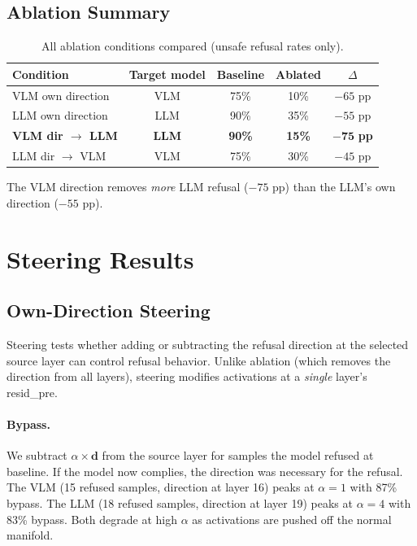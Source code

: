 \documentclass[11pt,a4paper]{article}
\begin{document}
\subsection{Ablation Summary}

\begin{table}[H]\centering
\caption{All ablation conditions compared (unsafe refusal rates only).}
\begin{tabular}{lcccc}
\toprule
\textbf{Condition} & \textbf{Target model} & \textbf{Baseline} & \textbf{Ablated} & \textbf{$\Delta$} \\
\midrule
VLM own direction & VLM & 75\% & 10\% & $-65$ pp \\
LLM own direction & LLM & 90\% & 35\% & $-55$ pp \\
\textbf{VLM dir $\to$ LLM} & \textbf{LLM} & \textbf{90\%} & \textbf{15\%} & $\mathbf{-75}$ \textbf{pp} \\
LLM dir $\to$ VLM & VLM & 75\% & 30\% & $-45$ pp \\
\bottomrule
\end{tabular}
\end{table}

The VLM direction removes \emph{more} LLM refusal ($-75$ pp) than the LLM's own direction ($-55$ pp).

\section{Steering Results}

\subsection{Own-Direction Steering}

Steering tests whether adding or subtracting the refusal direction at the selected source layer can control refusal behavior. Unlike ablation (which removes the direction from all layers), steering modifies activations at a \emph{single} layer's resid\_pre.

\paragraph{Bypass.} We subtract $\alpha \times \mathbf{d}$ from the source layer for samples the model refused at baseline. If the model now complies, the direction was necessary for the refusal. The VLM (15 refused samples, direction at layer 16) peaks at $\alpha=1$ with 87\% bypass. The LLM (18 refused samples, direction at layer 19) peaks at $\alpha=4$ with 83\% bypass. Both degrade at high $\alpha$ as activations are pushed off the normal manifold.
\end{document}
